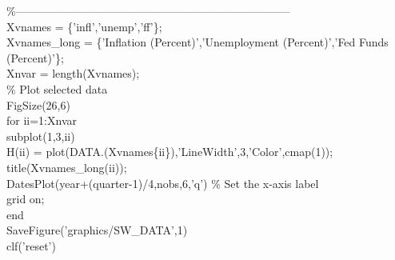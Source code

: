 \hspace{1mm}\textcolor{matlabgreen}{\%--------------------------------------------------------------------------  }\\ 
\hspace{1mm}Xvnames      = \{\textcolor{matlabpurple}{'infl'},\textcolor{matlabpurple}{'unemp'},\textcolor{matlabpurple}{'ff'}\}; \\ 
\hspace{1mm}Xvnames\_long = \{\textcolor{matlabpurple}{'Inflation (Percent)'},\textcolor{matlabpurple}{'Unemployment (Percent)'},\textcolor{matlabpurple}{'Fed Funds (Percent)'}\}; \\ 
\hspace{1mm}Xnvar        = length(Xvnames); \\ 
\hspace{1mm}\textcolor{matlabgreen}{\% Plot selected data }\\ 
\hspace{1mm}FigSize(26,6) \\ 
\hspace{1mm}\textcolor{matlabblue}{for} ii=1:Xnvar \\ 
\hspace{1mm}\hspace{5mm} subplot(1,3,ii) \\ 
\hspace{1mm}\hspace{5mm} H(ii) = plot(DATA.(Xvnames\{ii\}),\textcolor{matlabpurple}{'LineWidth'},3,\textcolor{matlabpurple}{'Color'},cmap(1)); \\ 
\hspace{1mm}\hspace{5mm} title(Xvnames\_long(ii));  \\ 
\hspace{1mm}\hspace{5mm} DatesPlot(year+(quarter-1)/4,nobs,6,\textcolor{matlabpurple}{'q'}) \textcolor{matlabgreen}{\% Set the x-axis label  }\\ 
\hspace{1mm}\hspace{5mm} grid on;  \\ 
\hspace{1mm}\textcolor{matlabblue}{end} \\ 
\hspace{1mm}SaveFigure(\textcolor{matlabpurple}{'graphics/SW\_DATA'},1) \\ 
\hspace{1mm}clf(\textcolor{matlabpurple}{'reset'}) \\ 

